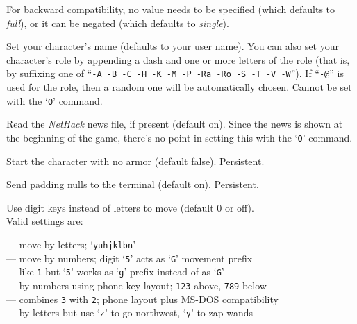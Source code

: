 For backward compatibility, no value needs to be specified (which
defaults to {\it full\/}), or it can be negated (which defaults
to {\it single\/}).
\item[\ib{name}]
Set your character's name (defaults to your user name).  You can also
set your character's role by appending a dash and one or more letters of
the role (that is, by suffixing one of
``{\tt -A -B -C -H -K -M -P -Ra -Ro -S -T -V -W}'').
If ``{\tt -@}'' is used for the role, then a random one will be
automatically chosen.
Cannot be set with the `{\tt O}' command.
\item[\ib{news}]
Read the {\it NetHack\/} news file, if present (default on).
Since the news is shown at the beginning of the game, there's no point
in setting this with the `{\tt O}' command.
\item[\ib{nudist}]
Start the character with no armor (default false).  Persistent.
\item[\ib{null}]
Send padding nulls to the terminal (default on).  Persistent.
\item[\ib{number\verb+_+pad}]
Use digit keys instead of letters to move (default 0 or off).\\
Valid settings are:

\newlength{\mwidth}
\settowidth{\mwidth}{\tt -0}
\newcommand{\numbox}[1]{\makebox[\mwidth][r]{{\tt #1}}}
\numbox{0} --- move by letters; `{\tt yuhjklbn}'\\
\numbox{1} --- move by numbers; digit `{\tt 5}' acts as `{\tt G}' movement prefix\\
\numbox{2} --- like {\tt 1} but `{\tt 5}' works as `{\tt g}' prefix instead of as `{\tt G}'\\
\numbox{3} --- by numbers using phone key layout; {\tt 123} above, {\tt 789} below\\
\numbox{4} --- combines {\tt 3} with {\tt 2}; phone layout plus MS-DOS compatibility\\
\numbox{-1} --- by letters but use `{\tt z}' to go northwest, `{\tt y}' to zap wands


